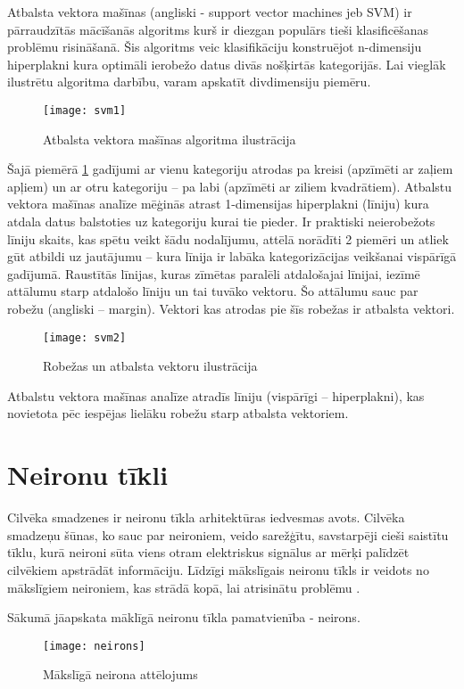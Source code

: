 Atbalsta vektora mašīnas \cite{supportvectornetworks} (angliski - support vector machines jeb SVM) ir pārraudzītās mācīšanās algoritms kurš ir diezgan populārs tieši klasificēšanas problēmu risināšanā. Šis algoritms veic klasifikāciju konstruējot n-dimensiju hiperplakni kura optimāli ierobežo datus divās nošķirtās kategorijās. Lai vieglāk ilustrētu algoritma darbību, varam apskatīt divdimensiju piemēru.
\begin{figure}[H]
	\texttt{[image: svm1]}
	\caption{Atbalsta vektora mašīnas algoritma ilustrācija \cite{supportvectornetworks} }
	\label{fig:svm1}
\end{figure}
Šajā piemērā \ref{fig:svm1} gadījumi ar vienu kategoriju atrodas pa kreisi (apzīmēti ar zaļiem apļiem) un ar otru kategoriju – pa labi (apzīmēti ar ziliem kvadrātiem). Atbalstu vektora mašīnas analīze mēģinās atrast 1-dimensijas hiperplakni (līniju) kura atdala datus balstoties uz kategoriju kurai tie pieder. Ir praktiski neierobežots līniju skaits, kas spētu veikt šādu nodalījumu, attēlā norādīti 2 piemēri un atliek gūt atbildi uz jautājumu – kura līnija ir labāka kategorizācijas veikšanai vispārīgā gadījumā. Raustītās līnijas, kuras zīmētas paralēli atdalošajai līnijai, iezīmē attālumu starp atdalošo līniju un tai tuvāko vektoru. Šo attālumu sauc par robežu (angliski – margin). Vektori kas atrodas pie šīs robežas ir atbalsta vektori.
\begin{figure}[H]
	\texttt{[image: svm2]}
	\caption{Robežas un atbalsta vektoru ilustrācija \cite{supportvectornetworks} }
	\label{fig:svm2}
\end{figure}
Atbalstu vektora mašīnas analīze atradīs līniju (vispārīgi – hiperplakni), kas novietota pēc iespējas lielāku robežu starp atbalsta vektoriem.

\section{Neironu tīkli}
Cilvēka smadzenes ir neironu tīkla arhitektūras iedvesmas avots. Cilvēka smadzeņu šūnas, ko sauc par neironiem, veido sarežģītu, savstarpēji cieši saistītu tīklu, kurā neironi sūta viens otram elektriskus signālus ar mērķi palīdzēt cilvēkiem apstrādāt informāciju. Līdzīgi mākslīgais neironu tīkls ir veidots no mākslīgiem neironiem, kas strādā kopā, lai atrisinātu problēmu \cite{AwsNeuralNetworks}. 

Sākumā jāapskata māklīgā neironu tīkla pamatvienība - neirons.
\begin{figure}[H]
	\texttt{[image: neirons]}
	\caption{Mākslīgā neirona attēlojums}
	\label{fig:neirons}
\end{figure}

